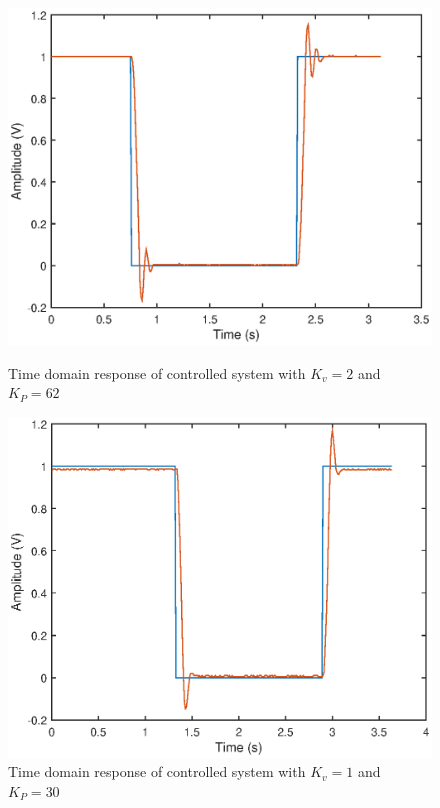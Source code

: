 \documentclass{article}
\begin{document}
\begin{figure}[H]
	\hspace{0.5cm}
	\begin{minipage}{7cm}
		\centering
		\includegraphics[scale=0.5]{fig21}
		\caption{Time domain response of controlled system with $K_v = 2$ and $K_P = 62$}
	\end{minipage}
	\hspace{1cm}
	\begin{minipage}{7cm}
		\centering
		\includegraphics[scale=0.5]{fig22}
		\caption{Time domain response of controlled system with $K_v = 1$ and $K_P = 30$}
	\end{minipage}
\end{figure}
\end{document}
